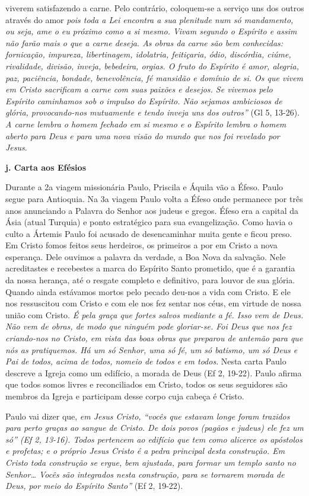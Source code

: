\documentclass[
]{book}
\begin{document}
viverem satisfazendo a carne. Pelo contrário, coloquem-se a serviço uns dos outros através do amor \emph{pois toda a Lei encontra a sua plenitude num só mandamento, ou seja, ame o eu próximo como a si mesmo. Vivam segundo o Espírito e assim não farão mais o que a carne deseja. As obras da carne são bem conhecidas: fornicação, impureza, libertinagem, idolatria, feitiçaria, ódio, discórdia, ciúme, rivalidade, divisão, inveja, bebedeira, orgias. O fruto do Espírito é amor, alegria, paz, paciência, bondade, benevolência, fé mansidão e domínio de si. Os que vivem em Cristo sacrificam a carne com suas paixões e desejos. Se vivemos pelo Espírito caminhamos sob o impulso do Espírito. Não sejamos ambiciosos de glória, provocando-nos mutuamente e tendo inveja uns dos outros''} (Gl 5, 13-26). \emph{A carne lembra o homem fechado em si mesmo e o Espírito lembra o homem aberto para Deus e para uma nova visão do mundo que nos foi revelado por Jesus}.

\textbf{j. Carta aos Efésios}

Durante a 2a viagem missionária Paulo, Priscila e Áquila vão a Éfeso. Paulo segue para Antioquia. Na 3a viagem Paulo volta a Éfeso onde permanece por três anos anunciando a Palavra do Senhor aos judeus e gregos. Éfeso era a capital da Ásia (atual Turquia) e ponto estratégico para sua evangelização. Como havia o culto a Ártemis Paulo foi acusado de desencaminhar muita gente e ficou preso. Em Cristo fomos feitos seus herdeiros, os primeiros a por em Cristo a nova esperança. Dele ouvimos a palavra da verdade, a Boa Nova da salvação. Nele acreditastes e recebestes a marca do Espírito Santo prometido, que é a garantia da nossa herança, até o resgate completo e definitivo, para louvor de sua glória. Quando ainda estávamos mortos pelo pecado deu-nos a vida com Cristo. E ele nos ressuscitou com Cristo e com ele nos fez sentar nos céus, em virtude de nossa união com Cristo. \emph{É pela graça que fortes salvos mediante a fé. Isso vem de Deus. Não vem de obras, de modo que ninguém pode gloriar-se. Foi Deus que nos fez criando-nos no Cristo, em vista das boas obras que preparou de antemão para que nós as pratiquemos. Há um só Senhor, uma só fé, um só batismo, um só Deus e Pai de todos, acima de todos, nomeio de todos e em todos}. Nesta carta Paulo descreve a Igreja como um edifício, a morada de Deus (Ef 2, 19-22). Paulo afirma que todos somos livres e reconciliados em Cristo, todos os seus seguidores são membros da Igreja e participam desse corpo cuja cabeça é Cristo.

Paulo vai dizer que, \emph{em Jesus Cristo, ``vocês que estavam longe foram trazidos para perto graças ao sangue de Cristo. De dois povos (pagãos e judeus) ele fez um só'' (Ef 2, 13-16). Todos pertencem ao edifício que tem como alicerce os apóstolos e profetas; e o próprio Jesus Cristo é a pedra principal desta construção. Em Cristo toda construção se ergue, bem ajustada, para formar um templo santo no Senhor\ldots{} Vocês são integrados nesta construção, para se tornarem morada de Deus, por meio do Espírito Santo''} (Ef 2, 19-22).
\end{document}

